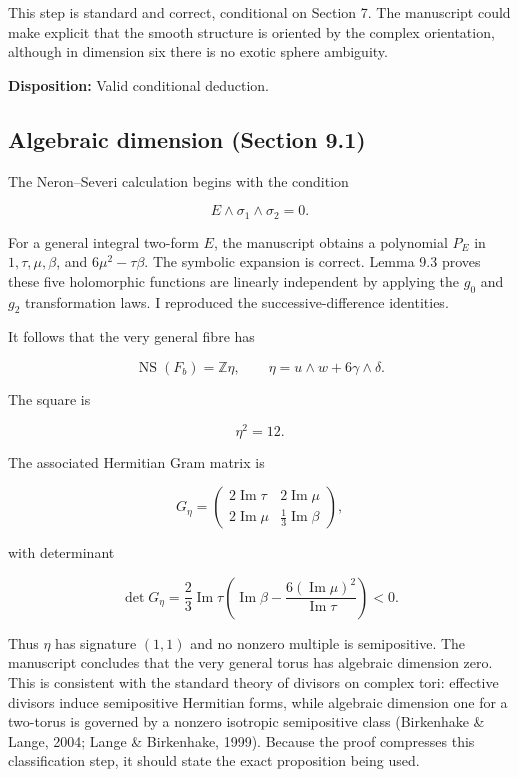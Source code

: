 \documentclass[
  10pt,
  letterpaper,
]{article}
\newcommand{\Z}{\mathbb Z}
\newcommand{\NS}{\operatorname{NS}}
\begin{document}
This step is standard and correct, conditional on Section 7. The
manuscript could make explicit that the smooth structure is oriented by
the complex orientation, although in dimension six there is no exotic
sphere ambiguity.

\textbf{Disposition:} Valid conditional deduction.

\subsection{Algebraic dimension (Section
9.1)}\label{algebraic-dimension-section-9.1}

The Neron--Severi calculation begins with the condition

\[
E\wedge\sigma_1\wedge\sigma_2=0.
\]

For a general integral two-form \(E\), the manuscript obtains a
polynomial \(P_E\) in \(1,\tau,\mu,\beta\), and \(6\mu^2-\tau\beta\).
The symbolic expansion is correct. Lemma 9.3 proves these five
holomorphic functions are linearly independent by applying the \(g_0\)
and \(g_2\) transformation laws. I reproduced the successive-difference
identities.

It follows that the very general fibre has

\[
\NS(F_b)=\Z\eta,
\qquad
\eta=u\wedge w+6\gamma\wedge\delta.
\]

The square is

\[
\eta^2=12.
\]

The associated Hermitian Gram matrix is

\[
G_\eta=
\begin{pmatrix}
2\operatorname{Im}\tau&2\operatorname{Im}\mu\\
2\operatorname{Im}\mu&\frac13\operatorname{Im}\beta
\end{pmatrix},
\]

with determinant

\[
\det G_\eta=
\frac23\operatorname{Im}\tau
\left(
\operatorname{Im}\beta-
\frac{6(\operatorname{Im}\mu)^2}{\operatorname{Im}\tau}
\right)<0.
\]

Thus \(\eta\) has signature \((1,1)\) and no nonzero multiple is
semipositive. The manuscript concludes that the very general torus has
algebraic dimension zero. This is consistent with the standard theory of
divisors on complex tori: effective divisors induce semipositive
Hermitian forms, while algebraic dimension one for a two-torus is
governed by a nonzero isotropic semipositive class (Birkenhake \& Lange,
2004; Lange \& Birkenhake, 1999). Because the proof compresses this
classification step, it should state the exact proposition being used.
\end{document}
